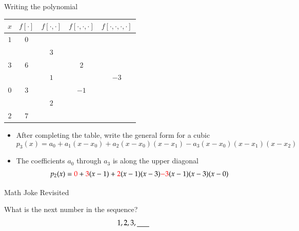 \documentclass[10pt]{beamer}
\begin{document}
\begin{frame}{Writing the polynomial}
\begin{center}
\begin{tabular}{c | c | c | c | c}
$x$ & $f[\cdot]$ & $f[\cdot,\cdot]$ & $f[\cdot,\cdot,\cdot]$ & $f[\cdot,\cdot,\cdot,\cdot]$\\\hline
$1$  & {\color{red}$0$} &    &                  &                      \\
      &             & {\color{red}$3$}&                  &                      \\
{$3$}  &  {$6$} &    &  {\color{red}$2$} &  \\ 
      &               & {$1$}&                  &  {\color{red}$-3$} \\
{$0$}  & {$3$}  &           & {$-1$}&                      \\
       &                                 & {$2$} &                  &                      \\
{$2$}   & {$7$} &          &                  &                      \\
\end{tabular}
\end{center}
\begin{itemize}
\item After completing the table, write the general form for a cubic
$$
p_3(x) = a_0 + a_1(x-x_0) + a_2(x-x_0)(x-x_1) -  a_3 (x-x_0)(x-x_1)(x-x_2)
$$      
\item The coefficients $a_0$ through $a_3$ is along the upper diagonal
\begin{align*}
  p_2(x) &= {\color{red}{0}} + {\color{red}{3}}(x-1) + {\color{red}{2}}(x-1)(x-3)   {\color{red}{-3}}(x-1)(x-3)(x-0)\\
\end{align*}

\end{itemize}
\end{frame}

\begin{frame}{Math Joke Revisited}

What is the next number in the sequence? 
$$ 1, 2, 3,\underline{\hspace{ 6 mm}} $$


\end{frame}
\end{document}
